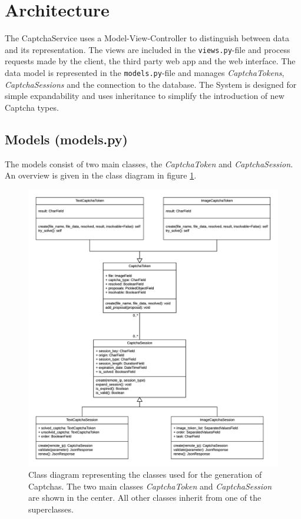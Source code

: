 \section{Architecture}
\label{sec:architecture}

The CaptchaService uses a Model-View-Controller to distinguish between data and its representation. The views are included in the \verb|views.py|-file and process requests made by the client, the third party web app and the web interface. 
The data model is represented in the \verb|models.py|-file and manages \emph{CaptchaTokens}, \emph{CaptchaSessions} and the connection to the database.
The System is designed for simple expandability and uses inheritance to simplify the introduction of new Captcha types. 

\subsection{Models (models.py)}

The models consist of two main classes, the \emph{CaptchaToken} and \emph{CaptchaSession}. An overview is given in the class diagram in figure \ref{fig:classdia}. 

\begin{figure}[!h]
\centering
\includegraphics[width=1.1\linewidth]{content/figures/classdiagramm.png}
\caption{Class diagram representing the classes used for the generation of Captchas. The two main classes \emph{CaptchaToken} and \emph{CaptchaSession} are shown in the center. All other classes inherit from one of the superclasses.
}
\label{fig:classdia}
\end{figure}

